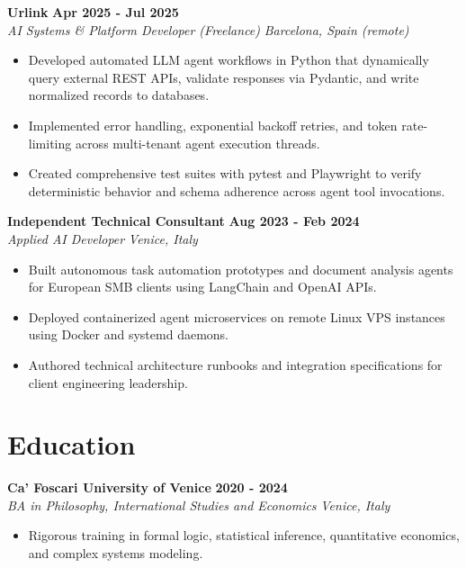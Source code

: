 \documentclass[10pt,a4paper]{article}
\newcommand{\role}[4]{%
  \textbf{#1} \hfill \textbf{#2}\\[1pt]%
  \textit{#3} \hfill \textit{#4}\\[2pt]%
}
\begin{document}
\role{Urlink}{Apr 2025 - Jul 2025}{AI Systems \& Platform Developer (Freelance)}{Barcelona, Spain (remote)}
\begin{itemize}
  \item Developed automated LLM agent workflows in Python that dynamically query external REST APIs, validate responses via Pydantic, and write normalized records to databases.
  \item Implemented error handling, exponential backoff retries, and token rate-limiting across multi-tenant agent execution threads.
  \item Created comprehensive test suites with pytest and Playwright to verify deterministic behavior and schema adherence across agent tool invocations.
\end{itemize}

\role{Independent Technical Consultant}{Aug 2023 - Feb 2024}{Applied AI Developer}{Venice, Italy}
\begin{itemize}
  \item Built autonomous task automation prototypes and document analysis agents for European SMB clients using LangChain and OpenAI APIs.
  \item Deployed containerized agent microservices on remote Linux VPS instances using Docker and systemd daemons.
  \item Authored technical architecture runbooks and integration specifications for client engineering leadership.
\end{itemize}

\section{Education}
\role{Ca' Foscari University of Venice}{2020 - 2024}{BA in Philosophy, International Studies and Economics}{Venice, Italy}
\begin{itemize}
  \item Rigorous training in formal logic, statistical inference, quantitative economics, and complex systems modeling.
\end{itemize}
\end{document}
